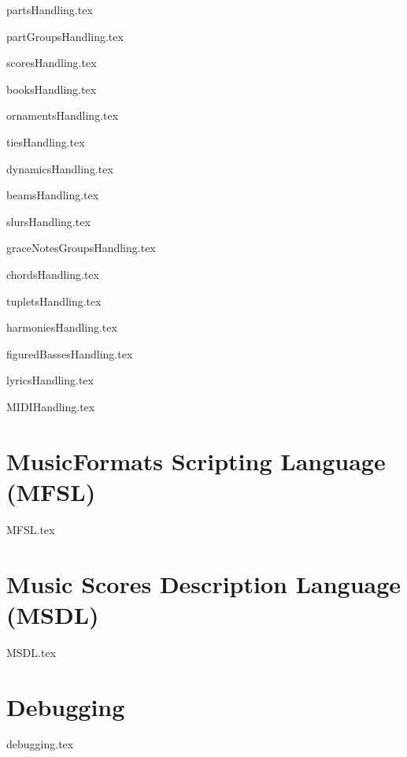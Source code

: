 \documentclass[11pt,a4paper]{report}
\begin{document}
{partsHandling.tex}

{partGroupsHandling.tex}

{scoresHandling.tex}

{booksHandling.tex}

{ornamentsHandling.tex}

{tiesHandling.tex}

{dynamicsHandling.tex}

{beamsHandling.tex}

{slursHandling.tex}

{graceNotesGroupsHandling.tex}

{chordsHandling.tex}

{tupletsHandling.tex}

{harmoniesHandling.tex}

{figuredBassesHandling.tex}

{lyricsHandling.tex}

{MIDIHandling.tex}


\part{MusicFormats Scripting Language (MFSL)}

{MFSL.tex}


\part{Music Scores Description Language (MSDL)}

{MSDL.tex}


\part{Debugging}

{debugging.tex}
\end{document}
